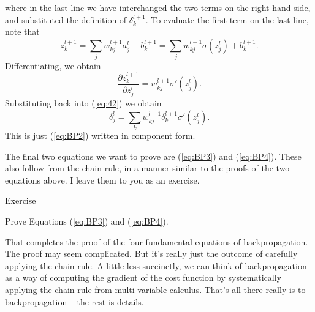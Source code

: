 \documentclass[a4paper,twoside,10pt]{book}
\begin{document}
where in the last line we have interchanged the two terms on the right-hand side, and substituted the definition of $\delta^{l+1}_k$. To evaluate the first term on the last line, note that
\begin{equation}
	z^{l+1}_k = \sum_j w^{l+1}_{kj} a^l_j +b^{l+1}_k = \sum_j w^{l+1}_{kj} \sigma(z^l_j) +b^{l+1}_k.
	\label{eq:43}
\end{equation}
Differentiating, we obtain
\begin{equation}
	\frac{\partial z^{l+1}_k}{\partial z^l_j} = w^{l+1}_{kj} \sigma'(z^l_j).
	\label{eq:44}
\end{equation}
Substituting back into (\ref{eq:42}) we obtain
\begin{equation}
	\delta^l_j = \sum_k w^{l+1}_{kj}  \delta^{l+1}_k \sigma'(z^l_j).
	\label{eq:45}
\end{equation}%
This is just (\ref{eq:BP2}) written in component form.

The final two equations we want to prove are (\ref{eq:BP3}) and (\ref{eq:BP4}). These also follow from the chain rule, in a manner similar to the proofs of the two equations above. I leave them to you as an exercise.

\begin{exercize}{Exercise}
	\item Prove Equations (\ref{eq:BP3}) and (\ref{eq:BP4}).
\end{exercize}
That completes the proof of the four fundamental equations of backpropagation. The proof may seem complicated. But it's really just the outcome of carefully applying the chain rule. A little less succinctly, we can think of backpropagation as a way of computing the gradient of the cost function by systematically applying the chain rule from multi-variable calculus. That's all there really is to backpropagation -- the rest is details.
\end{document}
